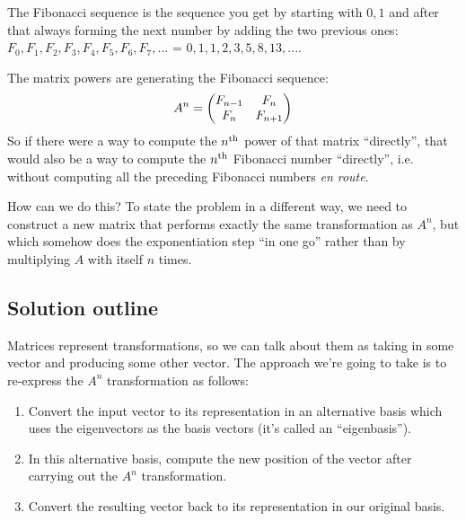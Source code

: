 The Fibonacci sequence is the sequence you get by starting with $0,
1$ and after that always forming the next number by adding the two previous ones:
$F_0, F_1, F_2, F_3, F_4, F_5, F_6, F_7, ...$ = $0, 1, 1, 2, 3, 5, 8, 13, ...$.

The matrix powers are generating the Fibonacci sequence:
\begin{align*}
  A^{n} = \begin{pmatrix}F_{n-1}  & F_n      \\F_n      & F_{n+1} \\ \end{pmatrix}
\end{align*}
So if there were a way to compute the $n^{\text{th}}$ power of that matrix ``directly'',
that would also be a way to compute the $n^{\text{th}}$ Fibonacci number ``directly'',
i.e. without computing all the preceding Fibonacci numbers \textit{en route}.

How can we do this? To state the problem in a different way, we need to
construct a new matrix that performs exactly the same transformation as $A^n$,
but which somehow does the exponentiation step ``in one go'' rather than by
multiplying $A$ with itself $n$ times.

\subsection*{Solution outline}

Matrices represent transformations, so we can talk about them as taking in some
vector and producing some other vector. The approach we're going to take is to
re-express the $A^n$ transformation as follows:

\begin{enumerate}
\item Convert the input vector to its representation in an alternative basis which uses the
  eigenvectors as the basis vectors (it's called an ``eigenbasis'').
\item In this alternative basis, compute the new position of the vector after carrying out the
  $A^n$ transformation.
\item Convert the resulting vector back to its representation in our original basis.
\end{enumerate}

